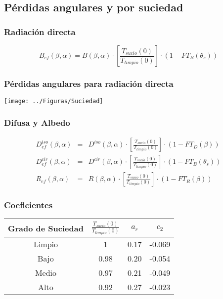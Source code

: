 \documentclass[serif, xcolor=dvipsnames]{beamer}
\begin{document}
\subsection{Pérdidas angulares y por suciedad}


\begin{frame}
\frametitle{Radiación directa}
\begin{block}
{}

\[
B_{ef}(\beta,\alpha)=B(\beta,\alpha)\cdot\left[\frac{T_{sucio}(0)}{T_{limpio}(0)}\right]\cdot (1-FT_{B}(\theta_{s}))\]


\end{block}

\end{frame}
\begin{frame}
\frametitle{Pérdidas angulares para radiación directa}

\begin{center}
\texttt{[image: ../Figuras/Suciedad]}
\par\end{center}


\end{frame}

\begin{frame}
\frametitle{Difusa y Albedo}
\begin{block}
{}

\begin{eqnarray*}
D_{ef}^{iso}(\beta,\alpha) & = & D^{iso}(\beta,\alpha)\cdot\left[\frac{T_{sucio}(0)}{T_{limpio}(0)}\right]\cdot(1-FT_{D}(\beta))\\
D_{ef}^{cir}(\beta,\alpha) & = & D^{cir}(\beta,\alpha)\cdot\left[\frac{T_{sucio}(0)}{T_{limpio}(0)}\right]\cdot(1-FT_{B}(\theta_{s}))\\
R_{ef}(\beta,\alpha) & = & R(\beta,\alpha)\cdot\left[\frac{T_{sucio}(0)}{T_{limpio}(0)}\right]\cdot(1-FT_{R}(\beta))\end{eqnarray*}


\end{block}

\end{frame}

\begin{frame}
\frametitle{Coeficientes}

\begin{center}
\begin{tabular}{cccc}
\toprule 
Grado de Suciedad & $\frac{T_{sucio}(0)}{T_{limpio}(0)}$ & $a_{r}$ & $c_{2}$\tabularnewline
\midrule 
Limpio & 1 & 0.17 & -0.069\tabularnewline
\midrule 
Bajo & 0.98 & 0.20 & -0.054\tabularnewline
\midrule 
Medio & 0.97 & 0.21 & -0.049\tabularnewline
\midrule 
Alto & 0.92 & 0.27 & -0.023\tabularnewline
\bottomrule
\end{tabular}
\par\end{center}


\end{frame}
\end{document}
